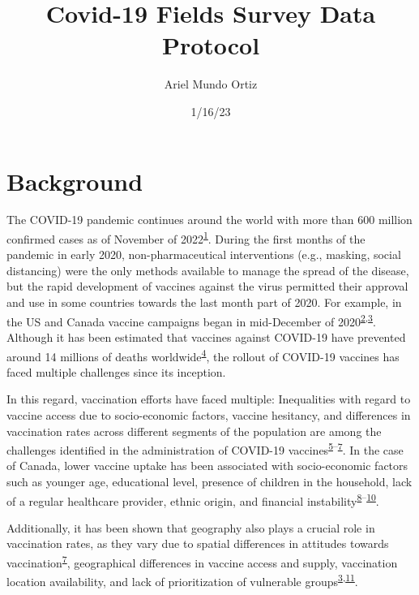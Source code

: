 \documentclass[
  letterpaper,
  DIV=11,
  numbers=noendperiod]{scrartcl}
\title{Covid-19 Fields Survey Data Protocol}
\author{Ariel Mundo Ortiz}
\date{1/16/23}
\begin{document}
\maketitle
\ifdefined\Shaded\renewenvironment{Shaded}{\begin{tcolorbox}[breakable, enhanced, frame hidden, sharp corners, borderline west={3pt}{0pt}{shadecolor}, boxrule=0pt, interior hidden]}{\end{tcolorbox}}\fi

\hypertarget{background}{%
\section{Background}\label{background}}

The COVID-19 pandemic continues around the world with more than 600
million confirmed cases as of November of
2022\textsuperscript{\protect\hyperlink{ref-WHO-Covid}{1}}. During the
first months of the pandemic in early 2020, non-pharmaceutical
interventions (e.g., masking, social distancing) were the only methods
available to manage the spread of the disease, but the rapid development
of vaccines against the virus permitted their approval and use in some
countries towards the last month part of 2020. For example, in the US
and Canada vaccine campaigns began in mid-December of
2020\textsuperscript{\protect\hyperlink{ref-tanne2020}{2},\protect\hyperlink{ref-bogoch2022}{3}}.
Although it has been estimated that vaccines against COVID-19 have
prevented around 14 millions of deaths
worldwide\textsuperscript{\protect\hyperlink{ref-watson2022}{4}}, the
rollout of COVID-19 vaccines has faced multiple challenges since its
inception.

In this regard, vaccination efforts have faced multiple: Inequalities
with regard to vaccine access due to socio-economic factors, vaccine
hesitancy, and differences in vaccination rates across different
segments of the population are among the challenges identified in the
administration of COVID-19
vaccines\textsuperscript{\protect\hyperlink{ref-gerretsen2021}{5}--\protect\hyperlink{ref-malik2020}{7}}.
In the case of Canada, lower vaccine uptake has been associated with
socio-economic factors such as younger age, educational level, presence
of children in the household, lack of a regular healthcare provider,
ethnic origin, and financial
instability\textsuperscript{\protect\hyperlink{ref-guay2022}{8}--\protect\hyperlink{ref-carter2022}{10}}.

Additionally, it has been shown that geography also plays a crucial role
in vaccination rates, as they vary due to spatial differences in
attitudes towards
vaccination\textsuperscript{\protect\hyperlink{ref-malik2020}{7}},
geographical differences in vaccine access and supply, vaccination
location availability, and lack of prioritization of vulnerable
groups\textsuperscript{\protect\hyperlink{ref-bogoch2022}{3},\protect\hyperlink{ref-nguyen2021}{11}}.
\end{document}
